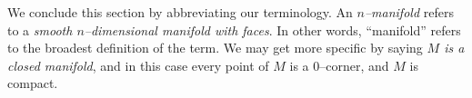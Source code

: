 We conclude this section by abbreviating our terminology.
An \emph{$n$--manifold} refers to a \emph{smooth $n$--dimensional manifold with faces}.
In other words, ``manifold'' refers to the broadest definition of the term.
We may get more specific by saying \emph{$M$ is a closed manifold}, and in this case every point of $M$ is a 0--corner, and $M$ is compact.


